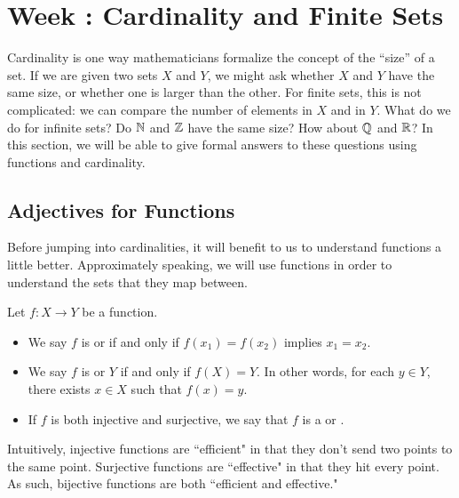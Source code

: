 \documentclass[../notes.tex]{subfiles}
\begin{document}
\section{Week \theweek: Cardinality and Finite Sets}
Cardinality is one way mathematicians formalize the concept of the ``size'' of a set. If we are given two sets $X$ and $Y$, we might ask whether $X$ and $Y$ have the same size, or whether one is larger than the other. For finite sets, this is not complicated: we can compare the number of elements in $X$ and in $Y$. What do we do for infinite sets? Do $\mathbb N$ and $\mathbb Z$ have the same size? How about $\mathbb Q$ and $\mathbb R$? In this section, we will be able to give formal answers to these questions using functions and cardinality.

\subsection{Adjectives for Functions}
Before jumping into cardinalities, it will benefit to us to understand functions a little better. Approximately speaking, we will use functions in order to understand the sets that they map between.
\begin{definition}
    Let $f\colon X \to Y$ be a function.
    \begin{itemize}
        \item We say $f$ is  or  if and only if $f(x_1) = f(x_2)$ implies $x_1 = x_2$.
        \item We say $f$ is  or  $Y$ if and only if $f(X) = Y$. In other words, for each $y\in Y$, there exists $x\in X$ such that $f(x)=y$.
        \item If $f$ is both injective and surjective, we say that $f$ is a  or .
    \end{itemize}
\end{definition}
Intuitively, injective functions are ``efficient" in that they don't send two points to the same point. Surjective functions are ``effective" in that they hit every point. As such, bijective functions are both ``efficient and effective."
\end{document}
